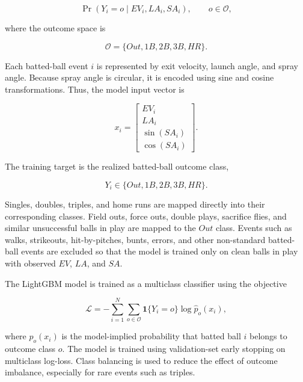 \documentclass[11pt]{article}
\begin{document}
\begin{equation}
    \Pr(Y_i = o \mid EV_i, LA_i, SA_i),
    \qquad
    o \in \mathcal{O},
\end{equation}

where the outcome space is

\begin{equation}
    \mathcal{O}
    =
    \{Out, 1B, 2B, 3B, HR\}.
\end{equation}

Each batted-ball event \(i\) is represented by exit velocity, launch angle, and spray angle. Because spray angle is circular, it is encoded using sine and cosine transformations. Thus, the model input vector is

\begin{equation}
    x_i
    =
    \begin{bmatrix}
        EV_i \\
        LA_i \\
        \sin(SA_i) \\
        \cos(SA_i)
    \end{bmatrix}.
\end{equation}

The training target is the realized batted-ball outcome class,

\begin{equation}
    Y_i \in \{Out, 1B, 2B, 3B, HR\}.
\end{equation}

Singles, doubles, triples, and home runs are mapped directly into their corresponding classes. Field outs, force outs, double plays, sacrifice flies, and similar unsuccessful balls in play are mapped to the \(Out\) class. Events such as walks, strikeouts, hit-by-pitches, bunts, errors, and other non-standard batted-ball events are excluded so that the model is trained only on clean balls in play with observed \(EV\), \(LA\), and \(SA\).

The LightGBM model is trained as a multiclass classifier using the objective

\begin{equation}
    \mathcal{L}
    =
    -
    \sum_{i=1}^{N}
    \sum_{o \in \mathcal{O}}
    \mathbf{1}\{Y_i = o\}
    \log
    \hat{p}_o(x_i),
\end{equation}

where \(\hat{p}_o(x_i)\) is the model-implied probability that batted ball \(i\) belongs to outcome class \(o\). The model is trained using validation-set early stopping on multiclass log-loss. Class balancing is used to reduce the effect of outcome imbalance, especially for rare events such as triples.
\end{document}
